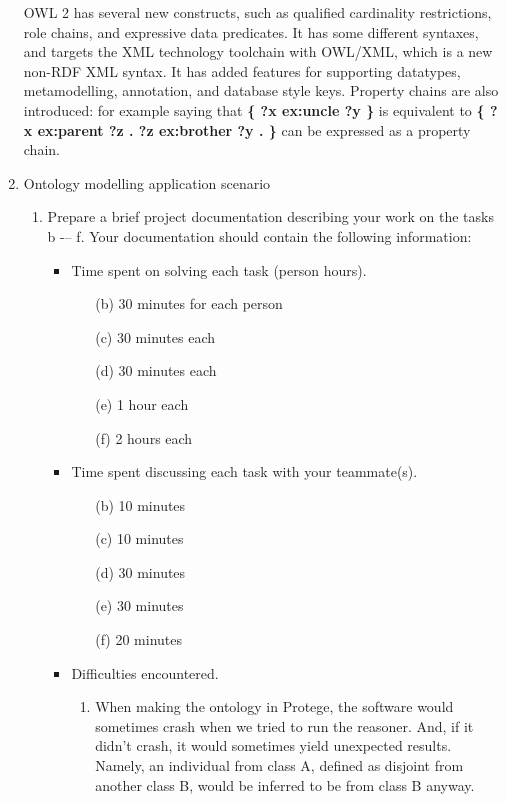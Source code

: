 \documentclass[10pt,a4paper]{article}
\begin{document}
\begin{enumerate}
OWL 2 has several new constructs, such as qualified cardinality restrictions, role chains, and expressive data predicates. It has some different syntaxes, and targets the XML technology toolchain with OWL/XML, which is a new non-RDF XML syntax. It has added features for supporting datatypes, metamodelling, annotation, and database style keys. Property chains are also introduced: for example saying that \textbf{\{ ?x ex:uncle ?y \}} is equivalent to \textbf{\{ ?x ex:parent ?z . ?z ex:brother ?y . \}} can be expressed as a property chain.

\item Ontology modelling application scenario

\begin{enumerate}

\item Prepare a brief project documentation describing your work on the tasks b -– f.
Your documentation should contain the following information:
	\begin{itemize}
		\item Time spent on solving each task (person hours).
			\begin{enumerate}
			\item[(b)] 30 minutes for each person
			\item[(c)] 30 minutes each
			\item[(d)] 30 minutes each
			\item[(e)] 1 hour each
			\item[(f)] 2 hours each
			\end{enumerate}
		\item Time spent discussing each task with your teammate(s).
			\begin{enumerate}
			\item[(b)] 10 minutes
			\item[(c)] 10 minutes
			\item[(d)] 30 minutes
			\item[(e)] 30 minutes
			\item[(f)] 20 minutes
			\end{enumerate}
		\item Difficulties encountered.
			\begin{enumerate}
			\item When making the ontology in Protege, the software would sometimes crash when we tried to run the reasoner. And, if it didn't crash, it would sometimes yield unexpected results. Namely, an individual from class A, defined as disjoint from another class B, would be inferred to be from class B anyway.

\end{enumerate}
\end{itemize}
\end{enumerate}
\end{enumerate}
\end{document}
